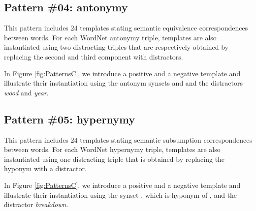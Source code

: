 \documentclass[11pt]{article}
\newcommand{\WORDNET}{WordNet}
\begin{document}
\subsection{Pattern \#04: antonymy}

This pattern includes 24 templates stating semantic equivalence correspondences between words. For each \WORDNET{} antonymy triple, templates are also instantiated using two distracting triples that are respectively obtained by replacing the second and third component with distractors.

In Figure \ref{fig:PatternsC}, we introduce a positive and a negative template and illustrate their instantiation using the antonym synsets  and  and the distractors {\it wood} and {\it year}.

\subsection{Pattern \#05: hypernymy}

This pattern includes 24 templates stating semantic subsumption correspondences between words. For each \WORDNET{} hypernymy triple, templates are also instantiated using one distracting triple that is obtained by replacing the hyponym with a distractor.

In Figure \ref{fig:PatternsC}, we introduce a positive and a negative template and illustrate their instantiation using the synset , which is hyponym of , and the distractor {\it breakdown}.
\end{document}
